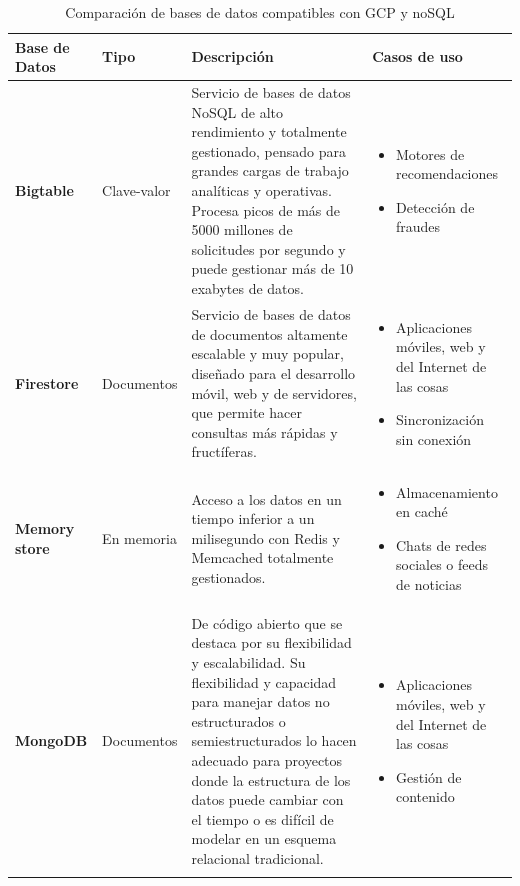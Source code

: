 \begin{longtable}{|m{2.2cm}|m{2.2cm}|m{6cm}|m{3cm}|}
\hline
\textbf{Base de Datos} & \textbf{Tipo} & \textbf{Descripción} & \textbf{Casos de uso}\\
\hline
\textbf
{Bigtable \cite{bigtable}} & 
Clave-valor &
Servicio de bases de datos NoSQL de alto rendimiento y totalmente gestionado, pensado para grandes cargas de trabajo analíticas y operativas. Procesa picos de más de 5000 millones de solicitudes por segundo y puede gestionar más de 10 exabytes de datos. &  
\begin{itemize}[label={}, leftmargin=0pt]
    \item Motores de recomendaciones
    \item Detección de fraudes
\end{itemize}\\
\hline
\textbf
{Firestore \cite{firestore}} & 
Documentos &
Servicio de bases de datos de documentos altamente escalable y muy popular, diseñado para el desarrollo móvil, web y de servidores, que permite hacer consultas más rápidas y fructíferas. & 
\begin{itemize}[label={}, leftmargin=0pt]
    \item Aplicaciones móviles, web y del Internet de las cosas
    \item Sincronización sin conexión
\end{itemize}\\
\hline
\textbf
{Memory store \cite{memorystore}} &
En memoria &
Acceso a los datos en un tiempo inferior a un milisegundo con Redis y Memcached totalmente gestionados. &
\begin{itemize}[label={}, leftmargin=0pt]
    \item Almacenamiento en caché
    \item Chats de redes sociales o feeds de noticias
\end{itemize}\\
\hline
\textbf
{MongoDB \cite{mongodb}} &
Documentos &
De código abierto que se destaca por su flexibilidad y escalabilidad. Su flexibilidad y capacidad para manejar datos no estructurados o semiestructurados lo hacen adecuado para proyectos donde la estructura de los datos puede cambiar con el tiempo o es difícil de modelar en un esquema relacional tradicional. &
\begin{itemize}[label={}, leftmargin=0pt]
    \item Aplicaciones móviles, web y del Internet de las cosas
    \item Gestión de contenido
\end{itemize}\\
\hline
\hline
\caption{Comparación de bases de datos compatibles con GCP y noSQL}
\label{tab:comparacion_bases_datos}
\end{longtable}

